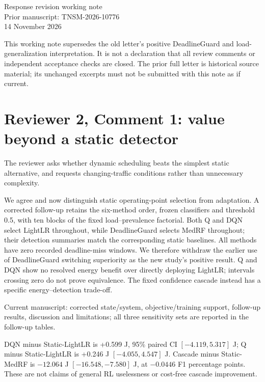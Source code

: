 \documentclass[10pt,a4paper]{article}
\begin{document}
\begin{center}{\Large Response revision working note}\\Prior manuscript: TNSM-2026-10776\\14 November 2026\end{center}
This working note supersedes the old letter's positive DeadlineGuard and load-generalization interpretation. It is not a declaration that all review comments or independent acceptance checks are closed. The prior full letter is historical source material; its unchanged excerpts must not be submitted with this note as if current.

\section*{Reviewer 2, Comment 1: value beyond a static detector}
\begin{commentbox}The reviewer asks whether dynamic scheduling beats the simplest static alternative, and requests changing-traffic conditions rather than unnecessary complexity.\end{commentbox}
\begin{responsebox}We agree and now distinguish static operating-point selection from adaptation. A corrected follow-up retains the six-method order, frozen classifiers and threshold 0.5, with ten blocks of the fixed load--prevalence factorial. Both Q and DQN select LightLR throughout, while DeadlineGuard selects MedRF throughout; their detection summaries match the corresponding static baselines. All methods have zero recorded deadline-miss windows. We therefore withdraw the earlier use of DeadlineGuard switching superiority as the new study's positive result. Q and DQN show no resolved energy benefit over directly deploying LightLR; intervals crossing zero do not prove equivalence. The fixed confidence cascade instead has a specific energy--detection trade-off.\end{responsebox}
\begin{wherebox}Current manuscript: corrected state/system, objective/training support, follow-up results, discussion and limitations; all three sensitivity sets are reported in the follow-up tables.\end{wherebox}
\begin{excerptbox}DQN minus Static-LightLR is +0.599 J, 95\% paired CI $[-4.119,5.317]$ J; Q minus Static-LightLR is +0.246 J $[-4.055,4.547]$ J. Cascade minus Static-MedRF is $-12.064$ J $[-16.548,-7.580]$ J, at $-0.0446$ F1 percentage points. These are not claims of general RL uselessness or cost-free cascade improvement.\end{excerptbox}
\end{document}
